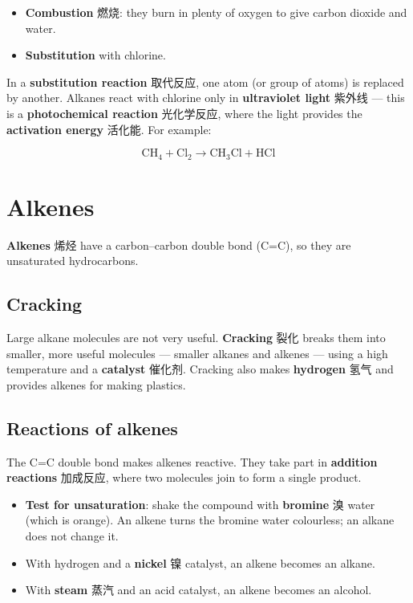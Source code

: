 \documentclass[11pt]{article}
\begin{document}
\begin{itemize}
\item \textbf{Combustion} 燃烧: they burn in plenty of oxygen to give carbon dioxide and water.

\item \textbf{Substitution} with chlorine.

\end{itemize}

In a \textbf{substitution reaction} 取代反应, one atom (or group of atoms) is replaced by another. Alkanes react with chlorine only in \textbf{ultraviolet light} 紫外线 — this is a \textbf{photochemical reaction} 光化学反应, where the light provides the \textbf{activation energy} 活化能. For example:

\[
\text{CH}_4 + \text{Cl}_2 \rightarrow \text{CH}_3\text{Cl} + \text{HCl}
\]

\section*{Alkenes}

\textbf{Alkenes} 烯烃 have a carbon–carbon double bond (C=C), so they are unsaturated hydrocarbons.

\subsection*{Cracking}

Large alkane molecules are not very useful. \textbf{Cracking} 裂化 breaks them into smaller, more useful molecules — smaller alkanes and alkenes — using a high temperature and a \textbf{catalyst} 催化剂. Cracking also makes \textbf{hydrogen} 氢气 and provides alkenes for making plastics.

\subsection*{Reactions of alkenes}

The C=C double bond makes alkenes reactive. They take part in \textbf{addition reactions} 加成反应, where two molecules join to form a single product.

\begin{itemize}
\item \textbf{Test for unsaturation}: shake the compound with \textbf{bromine} 溴 water (which is orange). An alkene turns the bromine water colourless; an alkane does not change it.

\item With hydrogen and a \textbf{nickel} 镍 catalyst, an alkene becomes an alkane.

\item With \textbf{steam} 蒸汽 and an acid catalyst, an alkene becomes an alcohol.

\end{itemize}
\end{document}

